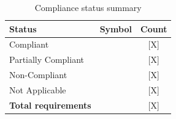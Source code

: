 %

\begin{table}[H]
    \centering
    \caption{Compliance status summary}
    \label{tab:moc_summary}
    \begin{tabular}{lcc}
        \toprule
        \textbf{Status} & \textbf{Symbol} & \textbf{Count} \\
        \midrule
        Compliant             & \compliant{}         & [X] \\
        Partially Compliant   & \partlycompliant{}   & [X] \\
        Non-Compliant         & \noncompliant{}      & [X] \\
        Not Applicable        & \notapplicable{}     & [X] \\
        \midrule
        \textbf{Total requirements} &               & [X] \\
        \bottomrule
    \end{tabular}
\end{table}
